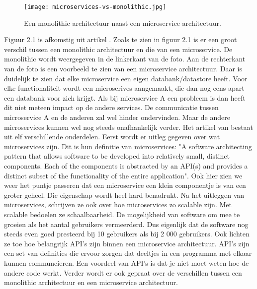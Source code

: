 \begin{figure}[h]
	\texttt{[image: microservices-vs-monolithic.jpg]}
	\centering
	\caption{Een monolithic architectuur naast een microservice architectuur. \textcite{Watts2018}}
\end{figure}
Figuur 2.1 is afkomstig uit artikel \textcite{Watts2018}.
Zoals te zien in figuur 2.1 is er een groot verschil tussen een monolithic architectuur en die van een microservice. De monolithic wordt weergegeven in de linkerkant van de foto. Aan de rechterkant van de foto is een voorbeeld te zien van een microservice architectuur. Daar is duidelijk te zien dat elke microservice een eigen databank/datastore heeft. Voor elke functionaliteit wordt een microserives aangemaakt, die dan nog eens apart een databank voor zich krijgt. Als bij microservice A een probleem is dan heeft dit niet meteen impact op de andere services. De communicatie tussen microservice A en de anderen zal wel hinder ondervinden. Maar de andere microservices kunnen wel nog steeds onafhankelijk verder. 
Het artikel van \textcite{series2018} bestaat uit elf verschillende onderdelen. Eerst wordt er uitleg gegeven over wat microservices zijn. Dit is hun definitie van microservices: "A software architecting pattern that allows software to be developed into relatively small, distinct components. Each of the components is abstracted by an API(s) and provides a distinct subset of the functionality of the entire application". Ook hier zien we weer het puntje passeren dat een microservice een klein componentje is van een groter geheel. Die eigenschap wordt heel hard benadrukt. Na het uitleggen van microservices, schrijven ze ook over hoe microservices zo scalable zijn. Met scalable bedoelen ze schaalbaarheid. De mogelijkheid van software om mee te groeien als het aantal gebruikers vermeerderd. Dus eigenlijk dat de software nog steeds even goed presteerd bij 10 gebruikers als bij 2 000 gebruikers. Ook lichten ze toe hoe belangrijk API's zijn binnen een microservice architectuur. API's zijn een set van definities die ervoor zorgen dat deeltjes in een programma met elkaar kunnen communcieren. Een voordeel van API's is dat je niet moet weten hoe de andere code werkt. Verder wordt er ook gepraat over de verschillen tussen een monolithic architectuur en een microservice architectuur. 


